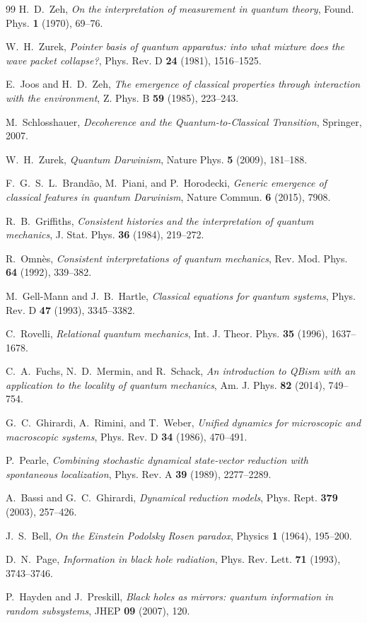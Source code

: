 \documentclass[11pt]{article}
\numberwithin{equation}{section}
\theoremstyle{definition}
\theoremstyle{remark}
\begin{document}
\begin{thebibliography}{99}
H.~D.~Zeh,
\emph{On the interpretation of measurement in quantum theory},
Found. Phys. \textbf{1} (1970), 69--76.

W.~H.~Zurek,
\emph{Pointer basis of quantum apparatus: into what mixture does the wave packet collapse?},
Phys. Rev. D \textbf{24} (1981), 1516--1525.

E.~Joos and H.~D.~Zeh,
\emph{The emergence of classical properties through interaction with the environment},
Z. Phys. B \textbf{59} (1985), 223--243.

M.~Schlosshauer,
\emph{Decoherence and the Quantum-to-Classical Transition},
Springer, 2007.

W.~H.~Zurek,
\emph{Quantum Darwinism},
Nature Phys. \textbf{5} (2009), 181--188.

F.~G.~S.~L.~Brand\~ao, M.~Piani, and P.~Horodecki,
\emph{Generic emergence of classical features in quantum Darwinism},
Nature Commun. \textbf{6} (2015), 7908.

R.~B.~Griffiths,
\emph{Consistent histories and the interpretation of quantum mechanics},
J. Stat. Phys. \textbf{36} (1984), 219--272.

R.~Omn\`es,
\emph{Consistent interpretations of quantum mechanics},
Rev. Mod. Phys. \textbf{64} (1992), 339--382.

M.~Gell-Mann and J.~B.~Hartle,
\emph{Classical equations for quantum systems},
Phys. Rev. D \textbf{47} (1993), 3345--3382.

C.~Rovelli,
\emph{Relational quantum mechanics},
Int. J. Theor. Phys. \textbf{35} (1996), 1637--1678.

C.~A.~Fuchs, N.~D.~Mermin, and R.~Schack,
\emph{An introduction to QBism with an application to the locality of quantum mechanics},
Am. J. Phys. \textbf{82} (2014), 749--754.

G.~C.~Ghirardi, A.~Rimini, and T.~Weber,
\emph{Unified dynamics for microscopic and macroscopic systems},
Phys. Rev. D \textbf{34} (1986), 470--491.

P.~Pearle,
\emph{Combining stochastic dynamical state-vector reduction with spontaneous localization},
Phys. Rev. A \textbf{39} (1989), 2277--2289.

A.~Bassi and G.~C.~Ghirardi,
\emph{Dynamical reduction models},
Phys. Rept. \textbf{379} (2003), 257--426.

J.~S.~Bell,
\emph{On the Einstein Podolsky Rosen paradox},
Physics \textbf{1} (1964), 195--200.

D.~N.~Page,
\emph{Information in black hole radiation},
Phys. Rev. Lett. \textbf{71} (1993), 3743--3746.

P.~Hayden and J.~Preskill,
\emph{Black holes as mirrors: quantum information in random subsystems},
JHEP \textbf{09} (2007), 120.

\end{thebibliography}
\end{document}
